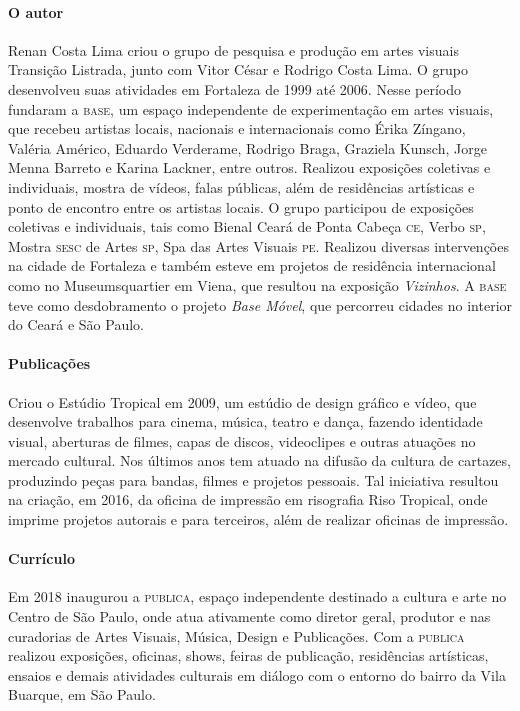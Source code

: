 \documentclass[11pt]{extarticle}
\begin{document}


\paragraph{O autor} Renan Costa Lima criou o grupo de pesquisa e produção em artes visuais Transição Listrada, junto com Vitor César e Rodrigo Costa Lima. O grupo desenvolveu suas atividades em Fortaleza de 1999 até 2006. Nesse período fundaram a \textsc{base}, um espaço independente de experimentação em artes visuais, que recebeu artistas locais, nacionais e internacionais como Érika Zíngano, Valéria Américo, Eduardo Verderame, Rodrigo Braga, Graziela Kunsch, Jorge Menna Barreto e Karina Lackner, entre outros. Realizou exposições coletivas e individuais, mostra de vídeos, falas públicas, além de residências artísticas e ponto de encontro entre os artistas locais. O grupo participou de exposições coletivas e individuais, tais como Bienal Ceará de Ponta Cabeça \textsc{ce}, Verbo \textsc{sp}, Mostra \textsc{sesc} de Artes \textsc{sp}, Spa das Artes Visuais \textsc{pe}. Realizou diversas intervenções na cidade de Fortaleza e também esteve em projetos de residência internacional como no Museumsquartier em Viena, que resultou na exposição \textit{Vizinhos}. A \textsc{base} teve como desdobramento o projeto \textit{Base Móvel}, que percorreu cidades no interior do Ceará e São Paulo. 



\paragraph{Publicações} Criou o Estúdio Tropical em 2009, um estúdio de design gráfico e vídeo, que desenvolve trabalhos para cinema, música, teatro e dança, fazendo identidade visual, aberturas de filmes, capas de discos, videoclipes e outras atuações no mercado cultural. Nos últimos anos tem atuado na difusão da cultura de cartazes, produzindo peças para bandas, filmes e projetos pessoais. Tal iniciativa resultou na criação, em 2016, da oficina de impressão em risografia Riso Tropical, onde imprime projetos autorais e para terceiros, além de realizar oficinas de impressão.

\paragraph{Currículo} Em 2018 inaugurou a \textsc{publica}, espaço independente destinado a cultura e arte no Centro de São Paulo, onde atua ativamente como diretor geral, produtor e nas curadorias de Artes Visuais, Música, Design e Publicações. Com a \textsc{publica} realizou exposições, oficinas, shows, feiras de publicação, residências artísticas, ensaios e demais atividades culturais em diálogo com o entorno do bairro da Vila Buarque, em São Paulo.
 
\end{document}
